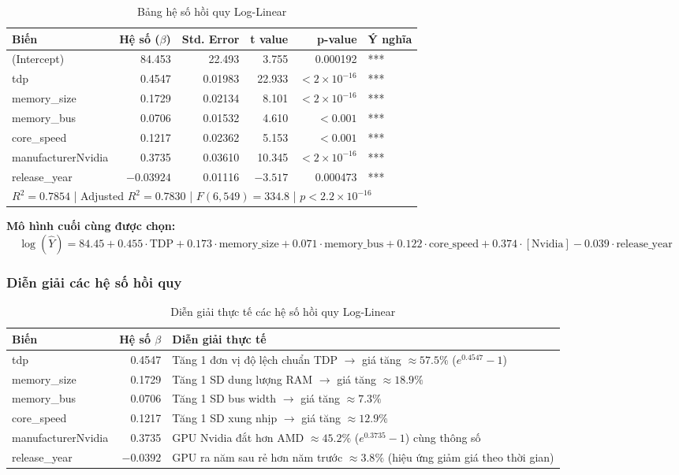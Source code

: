 \documentclass[a4paper]{article}
\begin{document}
\begin{table}[h!]
\centering
\caption{Bảng hệ số hồi quy Log-Linear}
\begin{tabular}{|l|r|r|r|r|l|}
\hline
\textbf{Biến} & \textbf{Hệ số ($\beta$)} & \textbf{Std. Error} & \textbf{t value} & \textbf{p-value} & \textbf{Ý nghĩa} \\
\hline
(Intercept) & 84.453 & 22.493 & 3.755 & 0.000192 & *** \\
tdp & 0.4547 & 0.01983 & 22.933 & $< 2 \times 10^{-16}$ & *** \\
memory\_size & 0.1729 & 0.02134 & 8.101 & $< 2 \times 10^{-16}$ & *** \\
memory\_bus & 0.0706 & 0.01532 & 4.610 & $< 0.001$ & *** \\
core\_speed & 0.1217 & 0.02362 & 5.153 & $< 0.001$ & *** \\
manufacturerNvidia & 0.3735 & 0.03610 & 10.345 & $< 2 \times 10^{-16}$ & *** \\
release\_year & $-0.03924$ & 0.01116 & $-3.517$ & 0.000473 & *** \\
\hline
\multicolumn{6}{|l|}{$R^2 = 0.7854$ | Adjusted $R^2 = 0.7830$ | $F(6,549) = 334.8$ | $p < 2.2 \times 10^{-16}$} \\
\hline
\end{tabular}
\end{table}

\textbf{Mô hình cuối cùng được chọn:}
\[
\log(\hat{Y}) = 84.45 + 0.455 \cdot \text{TDP} + 0.173 \cdot \text{memory\_size} + 0.071 \cdot \text{memory\_bus} + 0.122 \cdot \text{core\_speed} + 0.374 \cdot [\text{Nvidia}] - 0.039 \cdot \text{release\_year}
\]

\subsubsection{Diễn giải các hệ số hồi quy}

\begin{table}[h!]
\centering
\caption{Diễn giải thực tế các hệ số hồi quy Log-Linear}
\begin{tabular}{|l|r|p{7cm}|}
\hline
\textbf{Biến} & \textbf{Hệ số $\beta$} & \textbf{Diễn giải thực tế} \\
\hline
tdp & 0.4547 & Tăng 1 đơn vị độ lệch chuẩn TDP $\to$ giá tăng $\approx 57.5\%$ ($e^{0.4547}-1$) \\
memory\_size & 0.1729 & Tăng 1 SD dung lượng RAM $\to$ giá tăng $\approx 18.9\%$ \\
memory\_bus & 0.0706 & Tăng 1 SD bus width $\to$ giá tăng $\approx 7.3\%$ \\
core\_speed & 0.1217 & Tăng 1 SD xung nhịp $\to$ giá tăng $\approx 12.9\%$ \\
manufacturerNvidia & 0.3735 & GPU Nvidia đắt hơn AMD $\approx 45.2\%$ ($e^{0.3735}-1$) cùng thông số \\
release\_year & $-0.0392$ & GPU ra năm sau rẻ hơn năm trước $\approx 3.8\%$ (hiệu ứng giảm giá theo thời gian) \\
\hline
\end{tabular}
\end{table}
\end{document}
